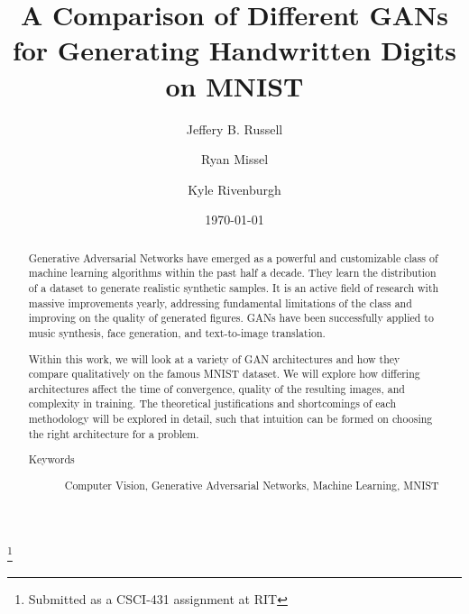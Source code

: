 \documentclass[12pt,
 reprint,
nofootinbib,
 amsmath,amssymb,
 aps,
floatfix,
]{revtex4-2}
\begin{document}

\title{A Comparison of Different GANs for Generating Handwritten Digits on MNIST}
\thanks{Submitted as a CSCI-431 assignment at RIT}%

\author{Jeffery B. Russell}
%

\author{Ryan Missel}
%


\author{Kyle Rivenburgh}
%

\date{\today}%

\begin{abstract}

Generative Adversarial Networks have emerged as a powerful and customizable class of machine learning algorithms within the past half a decade. They learn the distribution of a dataset to generate realistic synthetic samples. It is an active field of research with massive improvements yearly, addressing fundamental limitations of the class and improving on the quality of generated figures. GANs have been successfully applied to music synthesis, face generation, and text-to-image translation.

Within this work, we will look at a variety of GAN architectures and how they compare qualitatively on the famous MNIST dataset. We will explore how differing architectures affect the time of convergence, quality of the resulting images, and complexity in training. The theoretical justifications and shortcomings of each methodology will be explored in detail, such that intuition can be formed on choosing the right architecture for a problem.

\begin{description}
\item[Keywords]
Computer Vision, Generative Adversarial Networks, Machine Learning, MNIST
\end{description}

\end{abstract}
\maketitle
\end{document}

